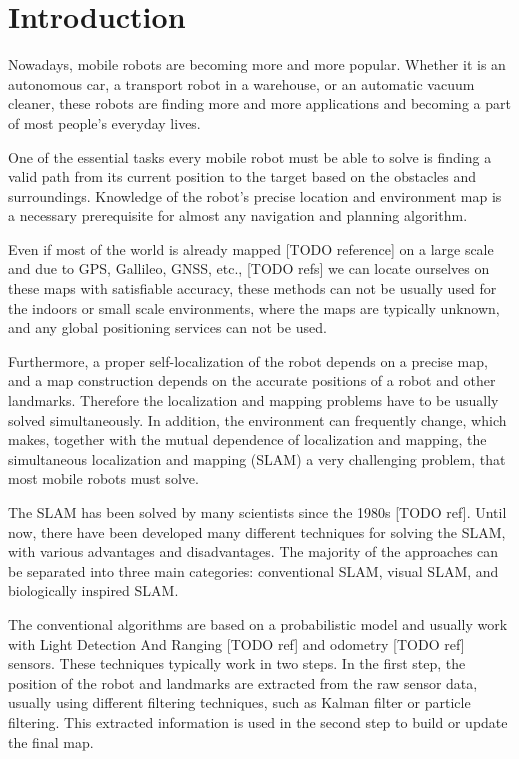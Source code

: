 \chapter{Introduction}\label{chapter:introduction}

Nowadays, mobile robots are becoming more and more popular. Whether it is an autonomous car, a transport robot in a warehouse, or an automatic vacuum cleaner, these robots are finding more and more applications and becoming a part of most people's everyday lives.\par
One of the essential tasks every mobile robot must be able to solve is finding a valid path from its current position to the target based on the obstacles and surroundings. Knowledge of the robot's precise location and environment map is a necessary prerequisite for almost any navigation and planning algorithm.\par
Even if most of the world is already mapped [TODO reference] on a large scale and due to GPS, Gallileo, GNSS, etc., [TODO refs] we can locate ourselves on these maps with satisfiable accuracy, these methods can not be usually used for the indoors or small scale environments, where the maps are typically unknown, and any global positioning services can not be used.\par
Furthermore, a proper self-localization of the robot depends on a precise map, and a map construction depends on the accurate positions of a robot and other landmarks. Therefore the localization and mapping problems have to be usually solved simultaneously. In addition, the environment can frequently change, which makes, together with the mutual dependence of localization and mapping, the simultaneous localization and mapping (SLAM) a very challenging problem, that most mobile robots must solve.\par
The SLAM has been solved by many scientists since the 1980s [TODO ref]. Until now, there have been developed many different techniques for solving the SLAM, with various advantages and disadvantages. The majority of the approaches can be separated into three main categories: conventional SLAM, visual SLAM, and biologically inspired SLAM.\par
The conventional algorithms are based on a probabilistic model and usually work with Light Detection And Ranging [TODO ref] and odometry [TODO ref] sensors. These techniques typically work in two steps. In the first step, the position of the robot and landmarks are extracted from the raw sensor data, usually using different filtering techniques, such as Kalman filter or particle filtering. This extracted information is used in the second step to build or update the final map.\par

